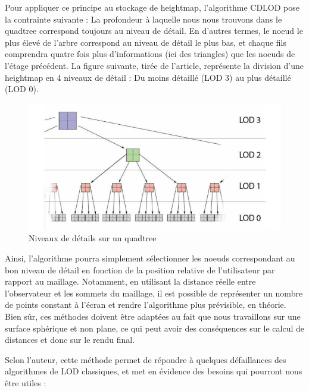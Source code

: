 \documentclass[12pt]{report}
\begin{document}
Pour appliquer ce principe au stockage de heightmap, l'algorithme CDLOD pose la contrainte suivante : La profondeur à laquelle nous nous trouvons dans le quadtree correspond toujours au niveau de détail. En d'autres termes, le noeud le plus élevé de l'arbre correspond au niveau de détail le plus bas, et chaque fils comprendra quatre fois plus d'informations (ici des triangles) que les noeuds de l'étage précédent. La figure suivante, tirée de l'article, représente la division d'une heightmap en 4 niveaux de détail : Du moins détaillé (LOD 3) au plus détaillé (LOD 0).

\vspace{0.3cm}

\begin{figure}[h]
\centering
\includegraphics[scale = 0.8]{images/CDLOD1.png}
\caption{Niveaux de détails sur un quadtree}
\end{figure}

\newpage

Ainsi, l'algorithme pourra simplement sélectionner les noeuds correspondant au bon niveau de détail en fonction de la position relative de l'utilisateur par rapport au maillage. Notamment, en utilisant la distance réelle entre l'observateur et les sommets du maillage, il est possible de représenter un nombre de points constant à l'écran et rendre l'algorithme plus prévisible, en théorie. Bien sûr, ces méthodes doivent être adaptées au fait que nous travaillons sur une surface sphérique et non plane, ce qui peut avoir des conséquences sur le calcul de distances et donc sur le rendu final.

Selon l'auteur, cette méthode permet de répondre à quelques défaillances des algorithmes de LOD classiques, et met en évidence des besoins qui pourront nous être utiles :
\end{document}
